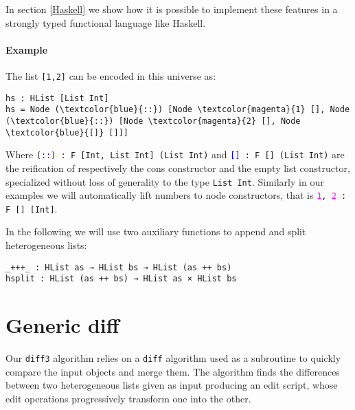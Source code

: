 \documentclass[preprint]{sigplanconf}
\begin{document}
	In section \ref{Haskell} we show how it is possible to implement these 
	features in a strongly typed functional language like Haskell.
	
        \paragraph{Example} 
        The list \texttt{[1,2]} can be encoded in this universe as: 
\begin{Verbatim}[commandchars=\\\{\}]
hs : HList [List Int]
hs = Node (\textcolor{blue}{::}) [Node \textcolor{magenta}{1} [], Node (\textcolor{blue}{::}) [Node \textcolor{magenta}{2} [], Node \textcolor{blue}{[]} []]]
\end{Verbatim}
        Where \texttt{(\textcolor{blue}{::}) : F [Int, List Int] (List Int)}
        and \texttt{\textcolor{blue}{[]} : F [] (List Int)} are the reification of respectively the cons constructor and the
        empty list constructor, specialized without loss of generality to the type \texttt{List Int}.
        Similarly in our examples we will automatically lift numbers to node constructors, that is
        \texttt{\textcolor{magenta}{1}, \textcolor{magenta}{2} : F [] [Int]}.

	In the following we will use two auxiliary functions to append and split 
	heterogeneous lists:
\begin{verbatim}
_+++_ : HList as → HList bs → HList (as ++ bs)
hsplit : HList (as ++ bs) → HList as × HList bs
\end{verbatim}
	
\section{Generic diff}
	Our \texttt{diff3} algorithm relies on a \texttt{diff} algorithm used 
        as a subroutine to quickly compare the input objects and merge them.
	The algorithm finds the differences between two heterogeneous lists given 
	as input producing an edit script, whose edit operations progressively 
	transform one into the other.
\end{document}

